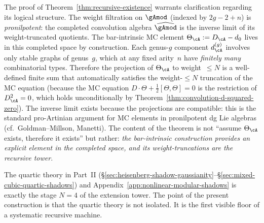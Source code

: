 \begin{remark}
\label{rem:recursive-existence-clarification}
The proof of Theorem~\ref{thm:recursive-existence} warrants
clarification regarding its logical structure.  The weight filtration
on $\gAmod$ (indexed by $2g - 2 + n$) is \emph{pronilpotent}:
the completed convolution algebra $\widehat{\gAmod}$ is the inverse
limit of its weight-truncated quotients.  The bar-intrinsic MC
element $\Theta_\cA := D_\cA - d_0$ lives in this completed space
by construction.  Each genus-$g$ component
$d_\cA^{(g)}$ involves only stable graphs of genus~$g$, which at
any fixed arity~$n$ have \emph{finitely many} combinatorial types.
Therefore the projection of $\Theta_\cA$ to weight~$\leq N$ is a
well-defined finite sum that automatically satisfies the
weight-$\leq N$ truncation of the MC equation (because the MC
equation $D \cdot \Theta + \tfrac{1}{2}[\Theta, \Theta] = 0$ is
the restriction of $D_\cA^2 = 0$, which holds unconditionally by
Theorem~\ref{thm:convolution-d-squared-zero}).  The inverse limit
exists because the projections are compatible: this is the standard
pro-Artinian argument for MC elements in pronilpotent dg Lie algebras
(cf.\ Goldman--Millson, Manetti).
The content of the theorem is not ``assume $\Theta_\cA$ exists,
therefore it exists'' but rather: \emph{the bar-intrinsic
construction provides an explicit element in the completed space,
and its weight-truncations are the recursive tower}.
\end{remark}

\begin{remark}
The quartic theory in Part~II
(\S\ref{sec:heisenberg-shadow-gaussianity}--\S\ref{sec:mixed-cubic-quartic-shadows})
and Appendix~\ref{app:nonlinear-modular-shadows}
is exactly the stage $N = 4$ of the extension tower.  The point of
the present construction is that the quartic theory is not isolated.
It is the first visible floor of a systematic recursive machine.
\end{remark}

